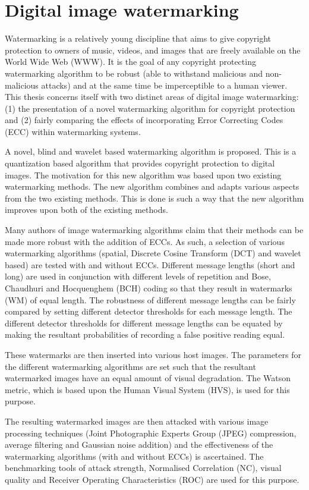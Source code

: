 \documentclass[12pt]{report}
\begin{document}
\section{Digital image watermarking}
Watermarking is a relatively young discipline that aims to give copyright protection to owners of music, videos, and images that are freely 
available on the World Wide Web (WWW). It is the goal of any copyright protecting watermarking algorithm to be robust 
(able to withstand malicious and non-malicious
attacks) and at the same time be imperceptible to a human viewer. This thesis concerns itself with two distinct areas of digital image
watermarking: (1) the presentation of a novel watermarking algorithm for copyright protection and (2) fairly comparing the effects of
incorporating Error Correcting Codes (ECC) within watermarking systems.

A novel, blind and wavelet based watermarking algorithm is proposed. This is a quantization based algorithm that provides copyright protection
to digital images. The motivation for this new algorithm was based upon two existing watermarking methods. The new algorithm combines and
adapts various aspects from the two existing methods. This is done is such a way that the new algorithm improves upon both of the existing
methods.

Many authors of image watermarking algorithms claim that their methods can be made more robust with the addition of ECCs. 
As such, a selection of various watermarking algorithms (spatial, Discrete Cosine Transform (DCT) and wavelet based) are tested with and without ECCs. 
Different message lengths (short and long) are used in conjunction with different levels of repetition and 
Bose, Chaudhuri and Hocquenghem (BCH) coding so that they result
in watermarks (WM) of equal length. The robustness of different message lengths can be fairly compared by setting different detector thresholds
for each message length. The different detector thresholds for different message lengths can be equated by making the resultant probabilities
of recording a false positive reading equal.

These watermarks are then inserted into various host images. The parameters for the different watermarking algorithms
are set such that the resultant watermarked images have an equal amount of visual degradation. The Watson metric, which is based upon the
Human Visual System (HVS), is used for this purpose.

The resulting watermarked images are then attacked with various image processing techniques 
(Joint Photographic Experts Group (JPEG) compression, average filtering and Gaussian noise addition)
and the effectiveness of the watermarking 
algorithms (with and without ECCs) is ascertained. 
The benchmarking tools of attack strength, Normalised Correlation (NC), visual quality and Receiver
Operating Characteristics (ROC) are used for this purpose.
\end{document}

